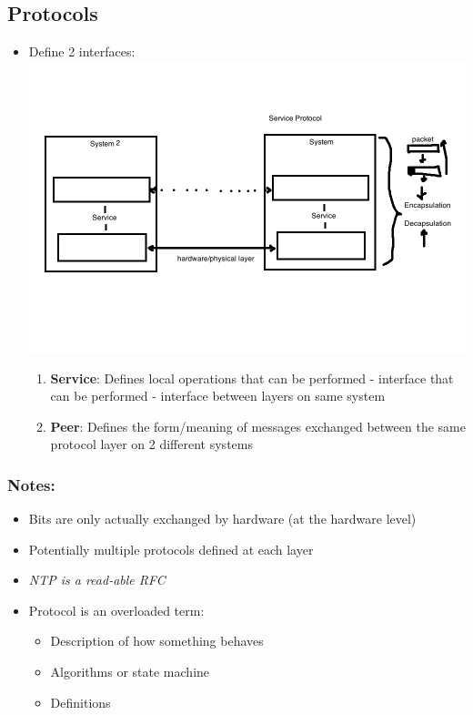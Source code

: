 \documentclass[11pt]{article}
\begin{document}
\subsection{Protocols}
\label{sec:orgheadline15}
\begin{itemize}
\item Define 2 interfaces:
\includegraphics[width=.9\linewidth]{diagrams/fig2.png}
\begin{enumerate}
\item \textbf{Service}: Defines local operations that can be performed - interface
that can be performed - interface between layers on same system
\item \textbf{Peer}: Defines the form/meaning of messages exchanged between the same
protocol layer on 2 different systems
\end{enumerate}
\end{itemize}

\subsubsection{Notes:}
\label{sec:orgheadline11}
\begin{itemize}
\item Bits are only actually exchanged by hardware (at the hardware level)
\item Potentially multiple protocols defined at each layer
\item \emph{NTP is a read-able RFC}
\item Protocol is an overloaded term:
\begin{itemize}
\item Description of how something behaves
\item Algorithms or state machine
\item Definitions
\end{itemize}
\end{itemize}
\end{document}
